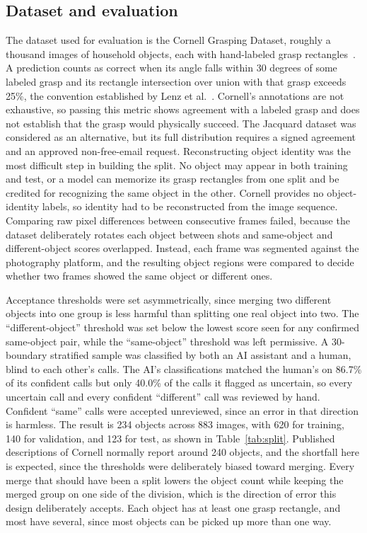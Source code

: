 \documentclass[12pt,letterpaper]{article}
\begin{document}
\subsection{Dataset and evaluation}

The dataset used for evaluation is the Cornell Grasping Dataset, roughly
a thousand images of household objects, each with hand-labeled grasp
rectangles~\cite{jiang2011}. A prediction counts as correct when its
angle falls within 30 degrees of some labeled grasp and its rectangle
intersection over union with that grasp exceeds 25\%, the convention
established by Lenz et al.~\cite{lenz2015}. Cornell's annotations are
not exhaustive, so passing this metric shows agreement with a labeled
grasp and does not establish that the grasp would physically succeed.
The Jacquard dataset was considered as an alternative, but its full
distribution requires a signed agreement and an approved non-free-email
request. Reconstructing object identity was the most difficult step in
building the split. No object may appear in both training and test, or a
model can memorize its grasp rectangles from one split and be credited
for recognizing the same object in the other. Cornell provides no
object-identity labels, so identity had to be reconstructed from the
image sequence. Comparing raw pixel differences between consecutive
frames failed, because the dataset deliberately rotates each object
between shots and same-object and different-object scores overlapped.
Instead, each frame was segmented against the photography platform, and
the resulting object regions were compared to decide whether two frames
showed the same object or different ones.

Acceptance thresholds were set asymmetrically, since merging two
different objects into one group is less harmful than splitting one real
object into two. The ``different-object'' threshold was set below the
lowest score seen for any confirmed same-object pair, while the
``same-object'' threshold was left permissive. A 30-boundary stratified
sample was classified by both an AI assistant and a human, blind to each
other's calls. The AI's classifications matched the human's on 86.7\% of
its confident calls but only 40.0\% of the calls it flagged as
uncertain, so every uncertain call and every confident ``different''
call was reviewed by hand. Confident ``same'' calls were accepted
unreviewed, since an error in that direction is harmless. The result is
234 objects across 883 images, with 620 for training, 140 for
validation, and 123 for test, as shown in Table~\ref{tab:split}.
Published descriptions of Cornell normally report around 240 objects,
and the shortfall here is expected, since the thresholds were
deliberately biased toward merging. Every merge that should have been a
split lowers the object count while keeping the merged group on one side
of the division, which is the direction of error this design
deliberately accepts. Each object has at least one grasp rectangle, and
most have several, since most objects can be picked up more than one
way.
\end{document}
